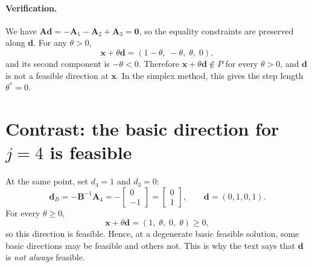 \documentclass[11pt]{article}
\newcommand{\A}{\mathbf{A}}
\newcommand{\B}{\mathbf{B}}
\newcommand{\x}{\mathbf{x}}
\newcommand{\dd}{\mathbf{d}}
\theoremstyle{definition}
\begin{document}
\paragraph{Verification.} We have $\A\dd = -\A_1-\A_2+\A_3 = \bm{0}$, so the equality constraints are preserved along $\dd$. For any $\theta>0$,
\[
\x+\theta\dd=(1-\theta,\;-\theta,\;\theta,\;0),
\]
and its second component is $-\theta<0$. Therefore $\x+\theta\dd\notin P$ for every $\theta>0$, and $\dd$ is not a feasible direction at $\x$. In the simplex method, this gives the step length $\theta^*=0$.

\section*{Contrast: the basic direction for $j=4$ is feasible}
At the same point, set $d_4=1$ and $d_3=0$:
\[
\dd_B=-\B^{-1}\A_4=-\begin{bmatrix}0\\-1\end{bmatrix}=\begin{bmatrix}0\\1\end{bmatrix},
\qquad
\dd=(0,1,0,1).
\]
For every $\theta\ge 0$,
\[
\x+\theta\dd=(1,\;\theta,\;0,\;\theta)\ge 0,
\]
so this direction is feasible. Hence, at a degenerate basic feasible solution, some basic directions may be feasible and others not. This is why the text says that $\dd$ is \emph{not always} feasible.
\end{document}
